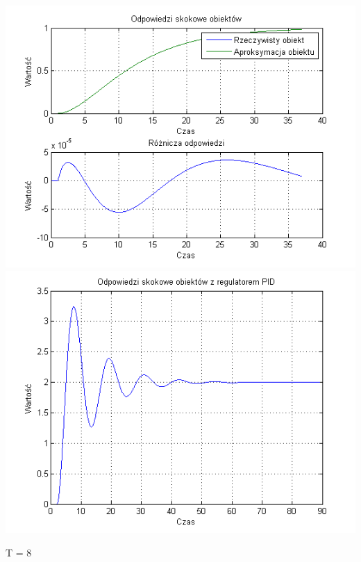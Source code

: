 \documentclass[10pt,a4paper]{article}
\begin{document}
\begin{center}
\includegraphics[scale=1]{images/dwa/skrypt_69.png}\\
\includegraphics[scale=1]{images/dwa/skrypt_70.png}\\
\end{center}
\newpage
T = 8
\end{document}
